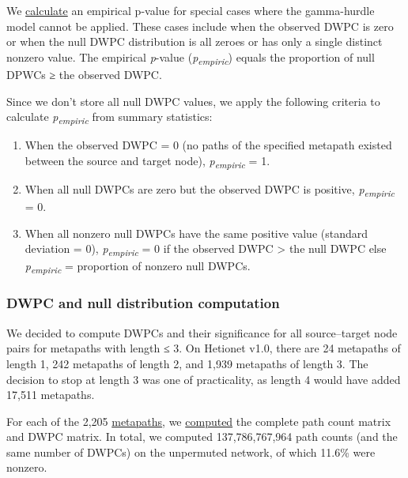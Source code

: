 We \href{https://github.com/hetio/hetmatpy/blob/bc36aa9859c43a1a5fb22808cd6eb952ef9d497c/hetmatpy/pipeline.py\#L92-L113}{calculate} an empirical p-value for special cases where the gamma-hurdle model cannot be applied.
These cases include when the observed DWPC is zero or when the null DWPC distribution is all zeroes or has only a single distinct nonzero value.
The empirical \emph{p}-value (\emph{p\textsubscript{empiric}}) equals the proportion of null DPWCs ≥ the observed DWPC.

Since we don't store all null DWPC values,
we apply the following criteria to calculate \emph{p\textsubscript{empiric}} from summary statistics:

\begin{enumerate}
\def\labelenumi{\arabic{enumi}.}
\tightlist
\item
  When the observed DWPC = 0 (no paths of the specified metapath existed between the source and target node),
  \emph{p\textsubscript{empiric}} = 1.
\item
  When all null DWPCs are zero but the observed DWPC is positive,
  \emph{p\textsubscript{empiric}} = 0.
\item
  When all nonzero null DWPCs have the same positive value (standard deviation = 0),
  \emph{p\textsubscript{empiric}} = 0 if the observed DWPC \textgreater{} the null DWPC else \emph{p\textsubscript{empiric}} = proportion of nonzero null DWPCs.
\end{enumerate}

\hypertarget{dwpc-and-null-distribution-computation}{%
\subsubsection{DWPC and null distribution computation}\label{dwpc-and-null-distribution-computation}}

We decided to compute DWPCs and their significance for all source--target node pairs for metapaths with length ≤ 3.
On Hetionet v1.0, there are 24 metapaths of length 1, 242 metapaths of length 2, and 1,939 metapaths of length 3.
The decision to stop at length 3 was one of practicality, as length 4 would have added 17,511 metapaths.

For each of the 2,205 \href{https://github.com/greenelab/connectivity-search-analyses/raw/042063fb559048e52b3dc2731b6d6c6836f698cf/explore/bulk-pipeline/archives/metapath-dwpc-stats.tsv}{metapaths},
we \href{https://github.com/greenelab/connectivity-search-analyses/blob/1c6827ce2544c17cef42bbccf098a312f2c44f97/explore/bulk-pipeline/bulk.ipynb}{computed} the complete path count matrix and DWPC matrix.
In total, we computed 137,786,767,964 path counts (and the same number of DWPCs) on the unpermuted network,
of which 11.6\% were nonzero.

